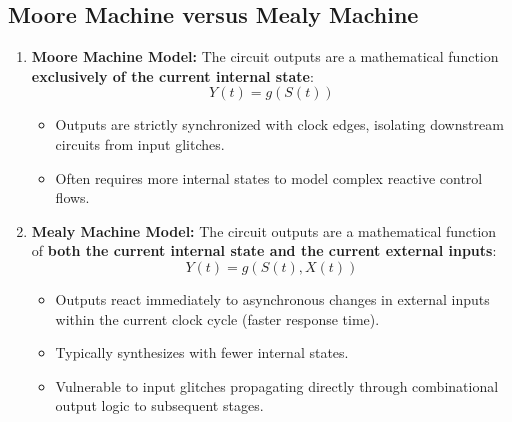 \subsection{Moore Machine versus Mealy Machine}
\begin{enumerate}[label=\bfseries\arabic*.]
    \item \textbf{Moore Machine Model:} The circuit outputs are a mathematical function \textbf{exclusively of the current internal state}:
    \begin{equation}
    \label{eq:moore_output}
    Y(t) = g(S(t))
    \end{equation}
    \begin{itemize}
        \item Outputs are strictly synchronized with clock edges, isolating downstream circuits from input glitches.
        \item Often requires more internal states to model complex reactive control flows.
    \end{itemize}
    \item \textbf{Mealy Machine Model:} The circuit outputs are a mathematical function of \textbf{both the current internal state and the current external inputs}:
    \begin{equation}
    \label{eq:mealy_output}
    Y(t) = g(S(t), X(t))
    \end{equation}
    \begin{itemize}
        \item Outputs react immediately to asynchronous changes in external inputs within the current clock cycle (faster response time).
        \item Typically synthesizes with fewer internal states.
        \item Vulnerable to input glitches propagating directly through combinational output logic to subsequent stages.
    \end{itemize}
\end{enumerate}

